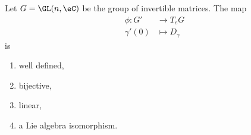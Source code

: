 \begin{theorem}     \label{THOooWQGMooHyjRtx}
    Let \( G=\GL(n,\eC)\) be the group of invertible matrices. The map
    \begin{equation}
        \begin{aligned}
            \phi\colon G'&\to T_eG \\
            \gamma'(0)&\mapsto D_{\gamma} 
        \end{aligned}
    \end{equation}
    is 
    \begin{enumerate}
        \item
            well defined,
        \item
            bijective,
        \item
            linear,
        \item
            a Lie algebra isomorphism.
    \end{enumerate}
\end{theorem}

